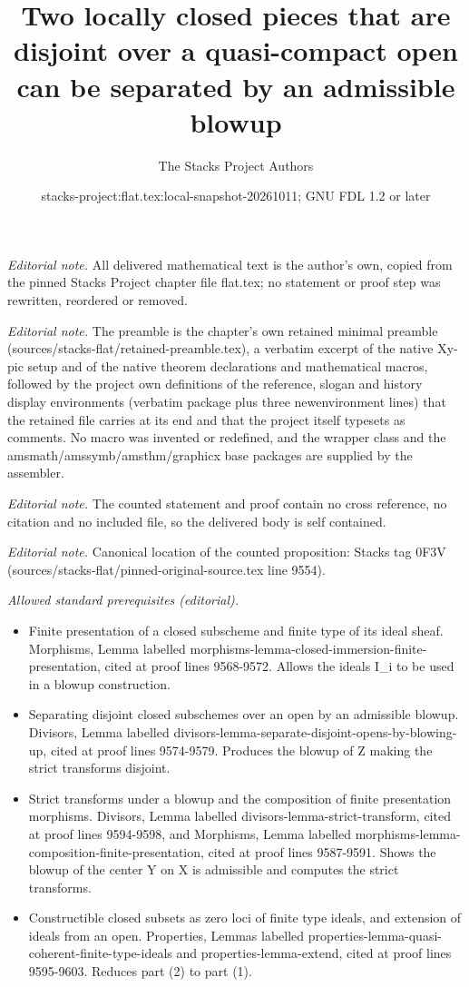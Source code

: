 \documentclass[10pt,a4paper]{amsart}
\title{Two locally closed pieces that are disjoint over a quasi-compact open can be separated by an admissible blowup}
\author{The Stacks Project Authors}
\date{stacks-project:flat.tex:local-snapshot-20261011; GNU FDL 1.2 or later}
\theoremstyle{plain}
\theoremstyle{definition}
\theoremstyle{remark}
\numberwithin{equation}{subsection}
\begin{document}
\maketitle
\noindent\textit{Editorial note.} All delivered mathematical text is the author's own, copied from the pinned Stacks Project chapter file flat.tex; no statement or proof step was rewritten, reordered or removed.\par\medskip
\noindent\textit{Editorial note.} The preamble is the chapter's own retained minimal preamble (sources/stacks-flat/retained-preamble.tex), a verbatim excerpt of the native Xy-pic setup and of the native theorem declarations and mathematical macros, followed by the project own definitions of the reference, slogan and history display environments (verbatim package plus three newenvironment lines) that the retained file carries at its end and that the project itself typesets as comments. No macro was invented or redefined, and the wrapper class and the amsmath/amssymb/amsthm/graphicx base packages are supplied by the assembler.\par\medskip
\noindent\textit{Editorial note.} The counted statement and proof contain no cross reference, no citation and no included file, so the delivered body is self contained.\par\medskip
\noindent\textit{Editorial note.} Canonical location of the counted proposition: Stacks tag 0F3V (sources/stacks-flat/pinned-original-source.tex line 9554).\par\medskip
\noindent\textit{Allowed standard prerequisites (editorial).}\begin{itemize}
\item Finite presentation of a closed subscheme and finite type of its ideal sheaf. Morphisms, Lemma labelled morphisms-lemma-closed-immersion-finite-presentation, cited at proof lines 9568-9572. Allows the ideals I\_i to be used in a blowup construction.
\item Separating disjoint closed subschemes over an open by an admissible blowup. Divisors, Lemma labelled divisors-lemma-separate-disjoint-opens-by-blowing-up, cited at proof lines 9574-9579. Produces the blowup of Z making the strict transforms disjoint.
\item Strict transforms under a blowup and the composition of finite presentation morphisms. Divisors, Lemma labelled divisors-lemma-strict-transform, cited at proof lines 9594-9598, and Morphisms, Lemma labelled morphisms-lemma-composition-finite-presentation, cited at proof lines 9587-9591. Shows the blowup of the center Y on X is admissible and computes the strict transforms.
\item Constructible closed subsets as zero loci of finite type ideals, and extension of ideals from an open. Properties, Lemmas labelled properties-lemma-quasi-coherent-finite-type-ideals and properties-lemma-extend, cited at proof lines 9595-9603. Reduces part (2) to part (1).
\end{itemize}\medskip
\end{document}
